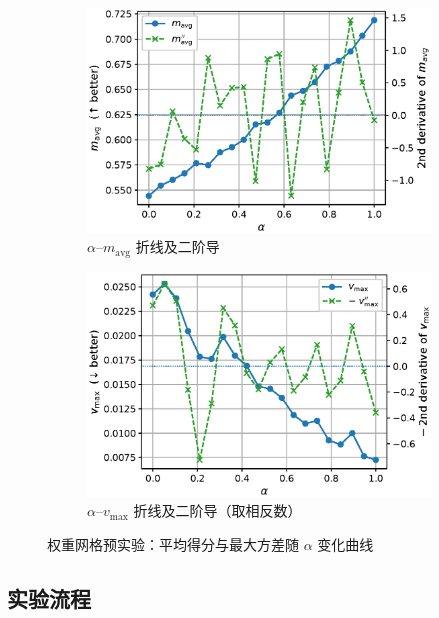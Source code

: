 \documentclass[10pt]{article} %
\numberwithin{equation}{section}
\begin{document}
\begin{figure}[t]
  \centering
  \begin{subfigure}{0.49\linewidth}
    \centering
    \includegraphics[width=\linewidth]{figures/4graph/alpha_vs_median.eps}
    \caption{$\alpha$–$m_{\mathrm{avg}}$ 折线及二阶导}
    \label{fig:alpha-vs-median}
  \end{subfigure}\hfill
  \begin{subfigure}{0.49\linewidth}
    \centering
    \includegraphics[width=\linewidth]{figures/4graph/alpha_vs_variance.eps}
    \caption{$\alpha$–$v_{\max}$ 折线及二阶导（取相反数）}
    \label{fig:alpha-vs-var}
  \end{subfigure}
  \caption{权重网格预实验：平均得分与最大方差随 $\alpha$ 变化曲线}
\end{figure}

\subsection{实验流程}\label{sec:exp_pipeline}
\end{document}
